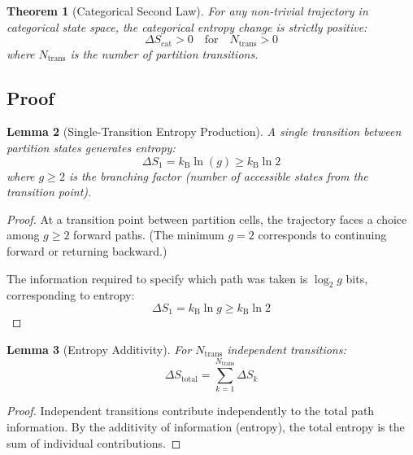 \documentclass[twocolumn,10pt,twoside]{article}
\newtheorem{theorem}{Theorem}[section]
\newtheorem{lemma}[theorem]{Lemma}
\newcommand{\kb}{k_{\mathrm{B}}}
\newcommand{\Scat}{S_{\mathrm{cat}}}
\begin{document}
\begin{theorem}[Categorical Second Law]
\label{thm:second_law}
For any non-trivial trajectory in categorical state space, the categorical entropy change is strictly positive:
\begin{equation}
\Delta \Scat > 0 \quad \text{for} \quad N_{\text{trans}} > 0
\label{eq:second_law}
\end{equation}
where $N_{\text{trans}}$ is the number of partition transitions.
\end{theorem}

\subsection{Proof}

\begin{lemma}[Single-Transition Entropy Production]
\label{lem:single_transition}
A single transition between partition states generates entropy:
\begin{equation}
\Delta S_1 = \kb \ln(g) \geq \kb \ln 2
\label{eq:single_entropy}
\end{equation}
where $g \geq 2$ is the branching factor (number of accessible states from the transition point).
\end{lemma}

\begin{proof}
At a transition point between partition cells, the trajectory faces a choice among $g \geq 2$ forward paths. (The minimum $g = 2$ corresponds to continuing forward or returning backward.)

The information required to specify which path was taken is $\log_2 g$ bits, corresponding to entropy:
\begin{equation}
\Delta S_1 = \kb \ln g \geq \kb \ln 2
\end{equation}
\end{proof}

\begin{lemma}[Entropy Additivity]
\label{lem:entropy_additivity}
For $N_{\text{trans}}$ independent transitions:
\begin{equation}
\Delta S_{\text{total}} = \sum_{k=1}^{N_{\text{trans}}} \Delta S_k
\end{equation}
\end{lemma}

\begin{proof}
Independent transitions contribute independently to the total path information. By the additivity of information (entropy), the total entropy is the sum of individual contributions.
\end{proof}
\end{document}
